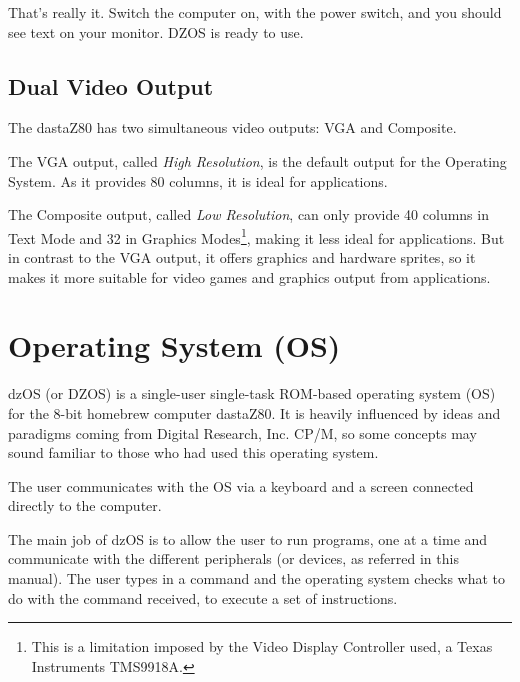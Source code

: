 \documentclass[a4paper,11pt]{article}
\begin{document}
    That’s really it. Switch the computer on, with the power switch, and you
    should see text on your monitor. DZOS is ready to use.

    \subsection{Dual Video Output}

    The dastaZ80 has two simultaneous video outputs: VGA and Composite.

    The VGA output, called \textit{High Resolution}, is the default output for
    the Operating System. As it provides 80 columns, it is ideal for
    applications.

    The Composite output, called \textit{Low Resolution}, can only provide 40
    columns in Text Mode and 32 in Graphics Modes\footnote{This is a limitation
    imposed by the Video Display Controller used, a Texas Instruments TMS9918A.},
    making it less ideal for applications. But in contrast to the VGA output, it
    offers graphics and hardware sprites, so it makes it more suitable for video
    games and graphics output from applications.

    \pagebreak
    \section{Operating System (OS)}
    dzOS (or DZOS) is a single-user single-task ROM-based operating system (OS)
    for the 8-bit homebrew computer dastaZ80. It is heavily influenced by ideas
    and paradigms coming from Digital Research, Inc. CP/M, so some concepts may
    sound familiar to those who had used this operating system.

    The user communicates with the OS via a keyboard and a screen connected
    directly to the computer.

    The main job of dzOS is to allow the user to run programs, one at a time and
    communicate with the different peripherals (or devices, as referred in this
    manual). The user types in a command and the operating system checks what to
    do with the command received, to execute a set of instructions.
\end{document}
